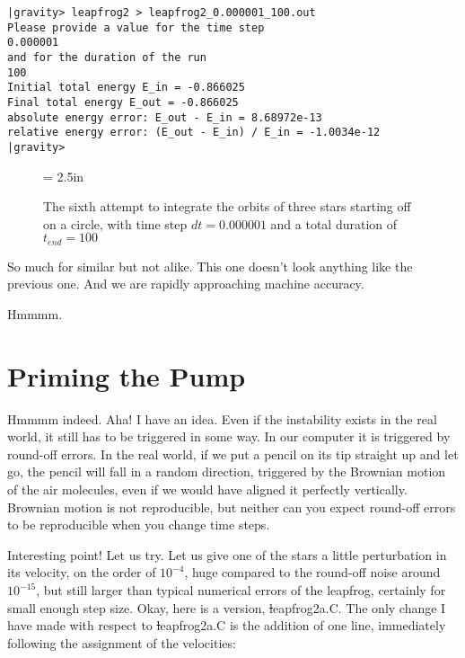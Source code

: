 \begin{small}
\begin{verbatim}
|gravity> leapfrog2 > leapfrog2_0.000001_100.out
Please provide a value for the time step
0.000001
and for the duration of the run
100
Initial total energy E_in = -0.866025
Final total energy E_out = -0.866025
absolute energy error: E_out - E_in = 8.68972e-13
relative energy error: (E_out - E_in) / E_in = -1.0034e-12
|gravity>
\end{verbatim}
\end{small}

\begin{figure}[htb]
\begin{center}
\epsfxsize = 2.5in
\caption[Three stars on a circle, leapfrog, $dt = 0.000001$, $t_{end} = 100$]
{The sixth attempt to integrate the orbits of three stars
starting off on a circle, with time step $dt = 0.000001$ and a total
duration of $t_{end} = 100$}
\label{fig:leap2-0.000001-100}
\end{center}
\end{figure}

\abc

\bob
So much for similar but not alike.  This one doesn't look anything
like the previous one.  And we are rapidly approaching machine accuracy.

\alice
Hmmmm.

\cba

\section{Priming the Pump}

\abc

\carol
Hmmmm indeed.  Aha!  I have an idea.  Even if the instability exists
in the real world, it still has to be triggered in some way.  In our
computer it is triggered by round-off errors.  In the real world, if
we put a pencil on its tip straight up and let go, the pencil will
fall in a random direction, triggered by the Brownian motion of the
air molecules, even if we would have aligned it perfectly vertically.
Brownian motion is not reproducible, but neither can you expect
round-off errors to be reproducible when you change time steps.

\alice
Interesting point!  Let us try.  Let us give one of the stars a little
perturbation in its velocity, on the order of $10^{-4}$, huge compared
to the round-off noise around $10^{-15}$, but still larger than typical
numerical errors of the leapfrog, certainly for small enough step size.
Okay, here is a version, {\st leapfrog2a.C}.  The only change I have
made with respect to {\st leapfrog2a.C} is the addition of one line,
immediately following the assignment of the velocities:

